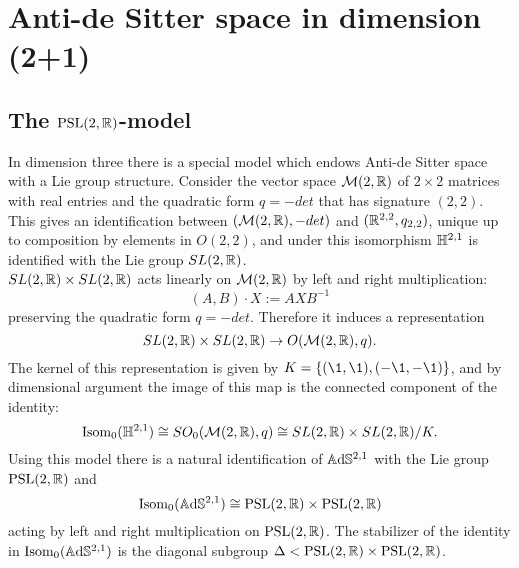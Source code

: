 \chapter{Anti-de Sitter space in dimension (2+1)} \label{chapter:3}

\section{The $\text{PSL}(2,\mathbb{R})$-model}
In dimension three there is a special model which endows Anti-de Sitter space with a Lie group structure.
Consider the vector space $\mathcal{M}(2,\mathbb{R})$ of $2 \times 2$ matrices with real entries and the quadratic form $q= -det$ that has signature $(2,2)$.
This gives an identification between $(\mathcal{M}(2,\mathbb{R}), -det)$ and $(\mathbb{R}^{2,2},q_{2,2})$, unique up to composition by elements in $O(2,2)$, and under this isomorphism $\mathbb{H}^{2,1}$ is identified with the Lie group $SL(2,\mathbb{R})$.\\
$SL(2,\mathbb{R})\times SL(2,\mathbb{R})$ acts linearly on $\mathcal{M}(2,\mathbb{R})$ by left and right multiplication:
\[
    (A,B) \cdot X := AXB^{-1}    
\]
preserving the quadratic form $q = -det$. Therefore it induces a representation
\[
    SL(2,\mathbb{R})\times SL(2,\mathbb{R}) \to O(\mathcal{M}(2,\mathbb{R}),q).
\]
The kernel of this representation is given by $K=\{ (\1,\1),(-\1,-\1) \}$, and by dimensional argument the image of this map is the connected component of the identity:
\[
    \text{Isom}_0(\mathbb{H}^{2,1}) \cong SO_0(\mathcal{M}(2,\mathbb{R}),q) \cong SL(2,\mathbb{R})\times SL(2,\mathbb{R}) / K.
\]
Using this model there is a natural identification of $\mathbb{A}\mathrm{d}\mathbb{S}^{2,1}$ with the Lie group $\text{PSL}(2,\mathbb{R})$ and
\[
    \text{Isom}_0(\mathbb{A}\mathrm{d}\mathbb{S}^{2,1}) \cong \text{PSL}(2,\mathbb{R}) \times \text{PSL}(2,\mathbb{R})
\]
acting by left and right multiplication on $\text{PSL}(2,\mathbb{R})$.
The stabilizer of the identity in $\text{Isom}_0(\mathbb{A}\mathrm{d}\mathbb{S}^{2,1})$ is the diagonal subgroup $\Delta < \text{PSL}(2,\mathbb{R}) \times \text{PSL}(2,\mathbb{R})$.\\

